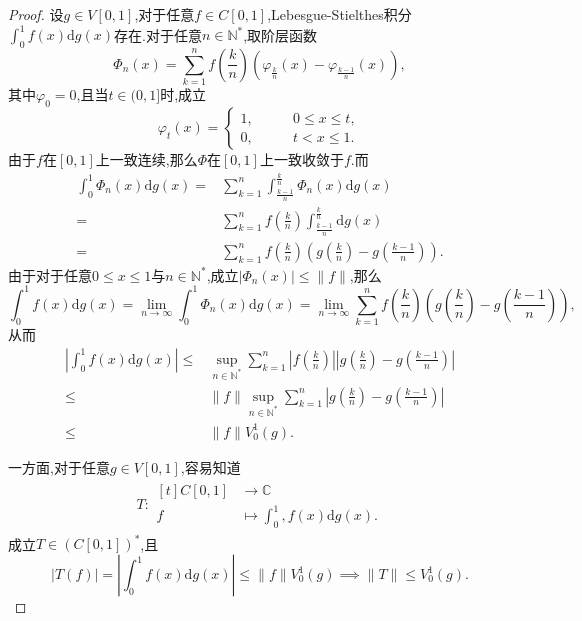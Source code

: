 \documentclass[lang = cn, scheme = chinese]{elegantbook}
\begin{document}
	\begin{proof}
		设$g\in V[0,1]$,对于任意$f\in C[0,1]$,Lebesgue-Stielthes积分$\displaystyle \int_0^1 f(x)\mathrm{d}g(x)$存在.对于任意$n\in\mathbb{N}^*$,取阶层函数
		$$
		\Phi_n(x)=\sum_{k=1}^{n}f\left(\frac{k}{n}\right)\left(\varphi_{\frac{k}{n}}(x)-\varphi_{\frac{k-1}{n}}(x)\right),
		$$
		其中$\varphi_0=0$,且当$t\in (0,1]$时,成立
		$$
		\varphi_t(x)=\begin{cases}
			1,\qquad & 0\le x\le t,\\
			0,\qquad & t<x\le 1.
		\end{cases}
		$$
		由于$f$在$[0,1]$上一致连续,那么$\Phi$在$[0,1]$上一致收敛于$f$.而
		\begin{align*}
			\int_0^1 \Phi_n(x)\mathrm{d}g(x)
			= & \sum_{k=1}^{n}\int_{\frac{k-1}{n}}^{\frac{k}{n}}\Phi_n(x)\mathrm{d}g(x)\\
			= & \sum_{k=1}^{n}f\left(\frac{k}{n}\right)\int_{\frac{k-1}{n}}^{\frac{k}{n}}\mathrm{d}g(x)\\
			= & \sum_{k=1}^{n}f\left(\frac{k}{n}\right)\left(g\left(\frac{k}{n}\right)-g\left(\frac{k-1}{n}\right)\right).
		\end{align*}
		由于对于任意$0\le x\le 1$与$n\in\mathbb{N}^*$,成立$|\Phi_n(x)|\le\|f\|$,那么
		$$
		\int_0^1f(x)\mathrm{d}g(x)
		= \lim_{n\to\infty}\int_0^1\Phi_n(x)\mathrm{d}g(x)
		= \lim_{n\to\infty}\sum_{k=1}^{n}f\left(\frac{k}{n}\right)\left(g\left(\frac{k}{n}\right)-g\left(\frac{k-1}{n}\right)\right),
		$$
		从而
		\begin{align*}
			\left|\int_0^1f(x)\mathrm{d}g(x)\right|
			\le & \sup_{n\in\mathbb{N}^*}\sum_{k=1}^{n}\left|f\left(\frac{k}{n}\right)\right|\left|g\left(\frac{k}{n}\right)-g\left(\frac{k-1}{n}\right)\right|\\
			\le & \|f\|\sup_{n\in\mathbb{N}^*}\sum_{k=1}^{n}\left|g\left(\frac{k}{n}\right)-g\left(\frac{k-1}{n}\right)\right|\\
			\le & \|f\| V_0^1(g).
		\end{align*}
		
		一方面,对于任意$g\in V[0,1]$,容易知道
		\begin{align*}
			T:\begin{aligned}[t]
				C[0,1]&\longrightarrow \mathbb{C}\\
				f&\longmapsto \int_0^1, f(x)\mathrm{d}g(x).
			\end{aligned}
		\end{align*}
		成立$T\in (C[0,1])^*$,且
		$$
		|T(f)|=\left|\int_0^1f(x)\mathrm{d}g(x)\right|
		\le \|f\| V_0^1(g)\implies
		\|T\|\le V_0^1(g).
		$$
		

\end{proof}
\end{document}
